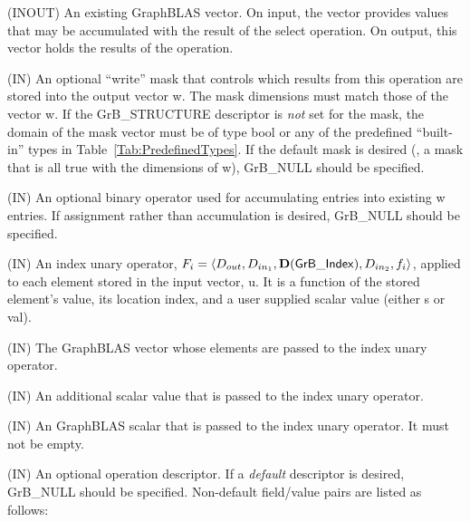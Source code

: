 \begin{itemize}[leftmargin=1.1in]
    \item[{\sf w}]    ({\sf INOUT}) An existing GraphBLAS vector.  On input,
    the vector provides values that may be accumulated with the result of the
    select operation.  On output, this vector holds the results of the
    operation.

    \item[{\sf mask}] ({\sf IN}) An optional ``write'' mask that controls which
    results from this operation are stored into the output vector {\sf w}. The 
    mask dimensions must match those of the vector {\sf w}. If the 
    {\sf GrB\_STRUCTURE} descriptor is {\em not} set for the mask, the domain of the
    {\sf mask} vector must be of type {\sf bool} or any of the predefined 
    ``built-in'' types in Table~\ref{Tab:PredefinedTypes}.  If the default
    mask is desired (\ie, a mask that is all {\sf true} with the dimensions of {\sf w}), 
    {\sf GrB\_NULL} should be specified.

    \item[{\sf accum}] ({\sf IN}) An optional binary operator used for accumulating
    entries into existing {\sf w} entries. If assignment rather than accumulation is
    desired, {\sf GrB\_NULL} should be specified.

{\color{red}
    \item[{\sf op}] ({\sf IN}) An index unary operator, 
    $F_i = \langle \mbox{$D_{out}$}, \mbox{$D_{in_{1}}$}, \mathbf{D}({\sf GrB\_Index}), \mbox{$D_{in_{2}}$}, f_{i} \rangle$, 
    applied to each element stored in the input vector, {\sf u}. It is a function 
    of the stored element's value, its location index,
    and a user supplied scalar value (either {\sf s} or {\sf val}).
}
    \item[{\sf u}] ({\sf IN}) The GraphBLAS vector whose elements are passed 
    to the index unary operator.

    \item[{\sf val}] ({\sf IN}) An additional scalar value that is passed to the 
    index unary operator.

{\color{red}
    \item[{\sf s}] ({\sf IN}) An GraphBLAS scalar that is passed to the 
    index unary operator.  It must not be empty.
}
    
    \item[{\sf desc}] ({\sf IN}) An optional operation descriptor. If
    a \emph{default} descriptor is desired, {\sf GrB\_NULL} should be
    specified. Non-default field/value pairs are listed as follows:  \\


\end{itemize}
